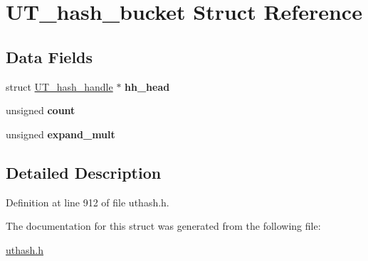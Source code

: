 \hypertarget{struct_u_t__hash__bucket}{
\section{UT\_\-hash\_\-bucket Struct Reference}
\label{struct_u_t__hash__bucket}
}
\subsection*{Data Fields}
\begin{DoxyCompactItemize}
\item 
\hypertarget{struct_u_t__hash__bucket_a785a785132212378bb28fb4341cfecaf}{
struct \hyperlink{struct_u_t__hash__handle}{UT\_\-hash\_\-handle} $\ast$ {\bfseries hh\_\-head}}
\label{struct_u_t__hash__bucket_a785a785132212378bb28fb4341cfecaf}

\item 
\hypertarget{struct_u_t__hash__bucket_a5d20cc12bdcbde360398910eefb45634}{
unsigned {\bfseries count}}
\label{struct_u_t__hash__bucket_a5d20cc12bdcbde360398910eefb45634}

\item 
\hypertarget{struct_u_t__hash__bucket_a9b739c1b69c141e8198c0c64af643b2b}{
unsigned {\bfseries expand\_\-mult}}
\label{struct_u_t__hash__bucket_a9b739c1b69c141e8198c0c64af643b2b}

\end{DoxyCompactItemize}


\subsection{Detailed Description}


Definition at line 912 of file uthash.h.



The documentation for this struct was generated from the following file:\begin{DoxyCompactItemize}
\item 
\hyperlink{uthash_8h}{uthash.h}\end{DoxyCompactItemize}
